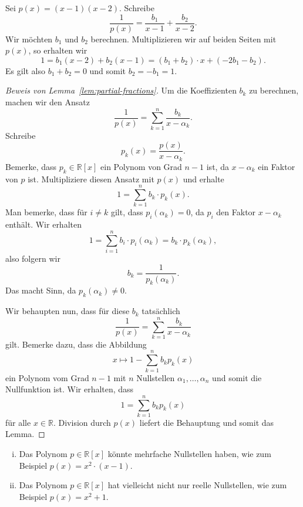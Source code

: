 \documentclass[../main.tex]{subfiles}
\begin{document}
\begin{example}
  Sei $p(x) = (x - 1)(x - 2)$. Schreibe
  \[
    \frac{1}{p(x)} = \frac{b_1}{x - 1} + \frac{b_2}{x - 2}.
  \]
  Wir möchten $b_1$ und $b_2$ berechnen.
  Multiplizieren wir auf beiden Seiten mit $p(x)$,
  so erhalten wir
  \[
    1 = b_1 (x- 2) + b_2(x-1) = (b_1 + b_2) \cdot x
    + (-2b_1 - b_2).
  \]
  Es gilt also $b_1 + b_2 = 0$ und somit $b_2 = -b_1 = 1$.
\end{example}

\begin{proof}[Beweis von Lemma~\ref{lem:partial-fractions}]
  Um die Koeffizienten $b_k$ zu berechnen,
  machen wir den Ansatz
  \[
    \frac{1}{p(x)} = \sum_{k=1}^{n} \frac{b_k}{x - \alpha_k}.
  \]
  Schreibe
  \[
    p_k(x) = \frac{p(x)}{x - \alpha_k}.
  \]
  Bemerke, dass $p_k \in \mathbb{R}[x]$ ein Polynom
  von Grad $n-1$ ist, da $x - \alpha_k$ ein
  Faktor von $p$ ist.
  Multipliziere diesen Ansatz mit $p(x)$ und erhalte
  \[
    1 = \sum_{k=1}^{n} b_k \cdot p_k(x).
  \]
  Man bemerke, dass für $i \ne k$ gilt, dass
  $p_i(\alpha_k) = 0$, da $p_i$ den Faktor
  $x - \alpha_k$ enthält.
  Wir erhalten
  \[
    1 = \sum_{i=1}^{n} b_i \cdot p_i(\alpha_k) = b_k \cdot p_k(\alpha_k),
  \]
  also folgern wir
  \[
    b_k = \frac{1}{p_k(\alpha_k)}.
  \]
  Das macht Sinn, da $p_k(\alpha_k) \neq 0$.
 
  Wir behaupten nun, dass für diese $b_k$ tatsächlich
  \[
    \frac{1}{p(x)} = \sum_{k=1}^{n}  \frac{b_k}{x - \alpha_k}
  \]
  gilt.
  Bemerke dazu, dass die Abbildung
  \[
    x \mapsto 1 - \sum_{k=1}^{n} b_k p_k(x)
  \]
  ein Polynom vom Grad $n-1$ mit $n$ Nullstellen
  $\alpha_1, \dots, \alpha_n$ und somit die Nullfunktion ist.
  Wir erhalten, dass
  \[
    1 = \sum_{k=1}^{n} b_k p_k(x)
  \]
  für alle $x \in \mathbb{R}$.
  Division durch $p(x)$ liefert die Behauptung und somit
  das Lemma.
\end{proof}

\begin{issues}
  \leavevmode
  \begin{enumerate}[(i)]
    \item Das Polynom $p \in \mathbb{R}[x]$ könnte mehrfache
      Nullstellen haben, wie zum Beispiel
      $p(x) = x^2 \cdot (x - 1)$.
    \item Das Polynom $p \in \mathbb{R}[x]$ hat vielleicht
      nicht nur reelle Nullstellen, wie zum Beispiel
      $p(x) = x^2 + 1$.
  \end{enumerate}
\end{issues}
\end{document}
